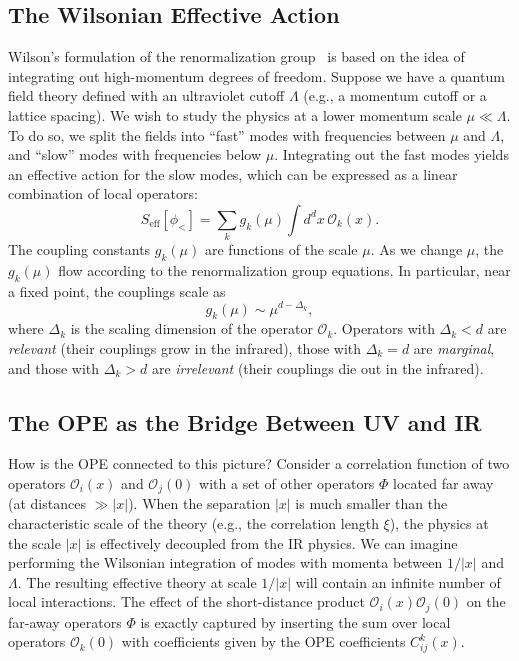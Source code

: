 \documentclass[11pt]{article}
\begin{document}
\subsection{The Wilsonian Effective Action}
Wilson's formulation of the renormalization group~\cite{Wilson:1971bg} is based on the idea of integrating out high-momentum degrees of freedom. Suppose we have a quantum field theory defined with an ultraviolet cutoff $\Lambda$ (e.g., a momentum cutoff or a lattice spacing). We wish to study the physics at a lower momentum scale $\mu \ll \Lambda$. To do so, we split the fields into ``fast'' modes with frequencies between $\mu$ and $\Lambda$, and ``slow'' modes with frequencies below $\mu$. Integrating out the fast modes yields an effective action for the slow modes, which can be expressed as a linear combination of local operators:
\begin{equation}
S_{\text{eff}}[\phi_{<}] = \sum_k g_k(\mu) \int d^d x \, \mathcal{O}_k(x) .
\label{eq:effaction}
\end{equation}
The coupling constants $g_k(\mu)$ are functions of the scale $\mu$. As we change $\mu$, the $g_k(\mu)$ flow according to the renormalization group equations. In particular, near a fixed point, the couplings scale as
\[
g_k(\mu) \sim \mu^{d - \Delta_k},
\]
where $\Delta_k$ is the scaling dimension of the operator $\mathcal{O}_k$. Operators with $\Delta_k < d$ are \emph{relevant} (their couplings grow in the infrared), those with $\Delta_k = d$ are \emph{marginal}, and those with $\Delta_k > d$ are \emph{irrelevant} (their couplings die out in the infrared).

\subsection{The OPE as the Bridge Between UV and IR}
How is the OPE connected to this picture? Consider a correlation function of two operators $\mathcal{O}_i(x)$ and $\mathcal{O}_j(0)$ with a set of other operators $\Phi$ located far away (at distances $\gg |x|$). When the separation $|x|$ is much smaller than the characteristic scale of the theory (e.g., the correlation length $\xi$), the physics at the scale $|x|$ is effectively decoupled from the IR physics. We can imagine performing the Wilsonian integration of modes with momenta between $1/|x|$ and $\Lambda$. The resulting effective theory at scale $1/|x|$ will contain an infinite number of local interactions. The effect of the short-distance product $\mathcal{O}_i(x)\mathcal{O}_j(0)$ on the far-away operators $\Phi$ is exactly captured by inserting the sum over local operators $\mathcal{O}_k(0)$ with coefficients given by the OPE coefficients $C_{ij}^k(x)$.
\end{document}
